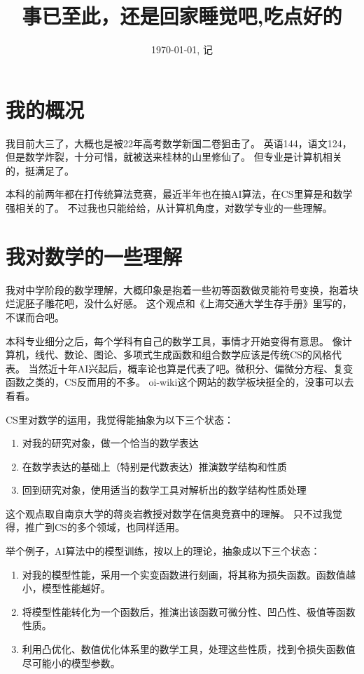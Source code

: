 \documentclass[a4paper, 12pt]{article}
\begin{document}
    \title{事已至此，还是回家睡觉吧,吃点好的}
    \author{}
    \date{\today , \; 记}
    \maketitle

    \section{我的概况}
    我目前大三了，大概也是被22年高考数学新国二卷狙击了。
    英语144，语文124，但是数学炸裂，十分可惜，就被送来桂林的山里修仙了。
    但专业是计算机相关的，挺满足了。
    
    本科的前两年都在打传统算法竞赛，最近半年也在搞AI算法，在CS里算是和数学强相关的了。
    不过我也只能给给，从计算机角度，对数学专业的一些理解。

    \section{我对数学的一些理解}
    我对中学阶段的数学理解，大概印象是抱着一些初等函数做灵能符号变换，抱着块烂泥胚子雕花吧，没什么好感。
    这个观点和《上海交通大学生存手册》里写的，不谋而合吧。
    
    本科专业细分之后，每个学科有自己的数学工具，事情才开始变得有意思。
    像计算机，线代、数论、图论、多项式生成函数和组合数学应该是传统CS的风格代表。
    当然近十年AI兴起后，概率论也算是代表了吧。微积分、偏微分方程、复变函数之类的，CS反而用的不多。
    oi-wiki这个网站的数学板块挺全的，没事可以去看看。

    \begin{samepage}
        \noindent CS里对数学的运用，我觉得能抽象为以下三个状态：
        \begin{enumerate}
            \item 对我的研究对象，做一个恰当的数学表达
            \item 在数学表达的基础上（特别是代数表达）推演数学结构和性质
            \item 回到研究对象，使用适当的数学工具对解析出的数学结构性质处理
        \end{enumerate}
    \end{samepage}

    这个观点取自南京大学的蒋炎岩教授对数学在信奥竞赛中的理解。
    只不过我觉得，推广到CS的多个领域，也同样适用。

    举个例子，AI算法中的模型训练，按以上的理论，抽象成以下三个状态：
    \begin{samepage}
        \begin{enumerate}
            \item 对我的模型性能，采用一个实变函数进行刻画，将其称为损失函数。函数值越小，模型性能越好。
            \item 将模型性能转化为一个函数后，推演出该函数可微分性、凹凸性、极值等函数性质。
            \item 利用凸优化、数值优化体系里的数学工具，处理这些性质，找到令损失函数值尽可能小的模型参数。
        \end{enumerate}
    \end{samepage}
\end{document}
